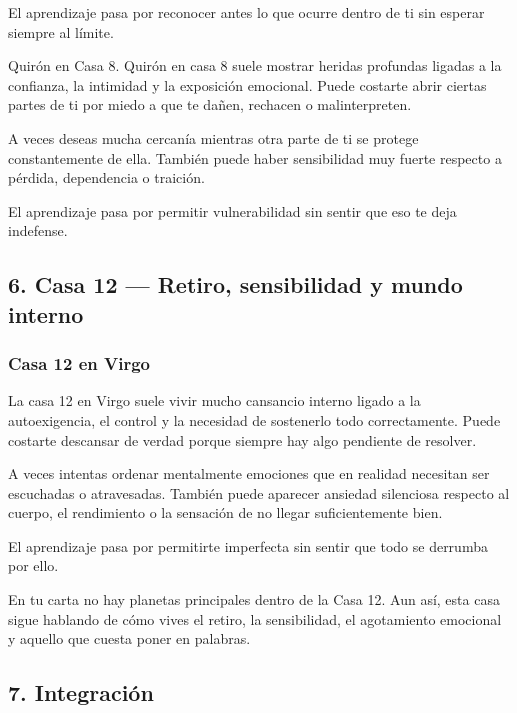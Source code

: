 \documentclass[11pt,a4paper]{article}
\begin{document}
El aprendizaje pasa por reconocer antes lo que ocurre dentro de ti sin esperar siempre al límite.

Quirón en Casa 8.
Quirón en casa 8 suele mostrar heridas profundas ligadas a la confianza, la intimidad y la exposición emocional. Puede costarte abrir ciertas partes de ti por miedo a que te dañen, rechacen o malinterpreten.

A veces deseas mucha cercanía mientras otra parte de ti se protege constantemente de ella. También puede haber sensibilidad muy fuerte respecto a pérdida, dependencia o traición.

El aprendizaje pasa por permitir vulnerabilidad sin sentir que eso te deja indefense.

\vspace{0.4cm}

\subsection{6. Casa 12 — Retiro, sensibilidad y mundo interno}

\subsubsection*{Casa 12 en Virgo}

La casa 12 en Virgo suele vivir mucho cansancio interno ligado a la autoexigencia, el control y la necesidad de sostenerlo todo correctamente. Puede costarte descansar de verdad porque siempre hay algo pendiente de resolver.

A veces intentas ordenar mentalmente emociones que en realidad necesitan ser escuchadas o atravesadas. También puede aparecer ansiedad silenciosa respecto al cuerpo, el rendimiento o la sensación de no llegar suficientemente bien.

El aprendizaje pasa por permitirte imperfecta sin sentir que todo se derrumba por ello.

En tu carta no hay planetas principales dentro de la Casa 12. Aun así, esta casa sigue hablando de cómo vives el retiro, la sensibilidad, el agotamiento emocional y aquello que cuesta poner en palabras.

\vspace{0.4cm}

\subsection{7. Integración}
\end{document}
